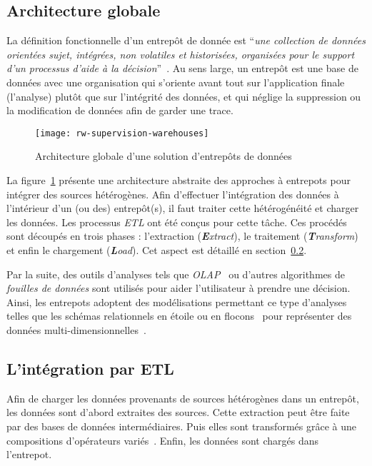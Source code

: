 \subsection{Architecture globale}
La définition fonctionnelle d'un entrepôt de donnée est \enquote{\it une collection de données orientées sujet, intégrées, non volatiles et historisées, organisées pour le support d’un processus d’aide à la décision}~\cite{Inmon:warehouse}. Au sens large, un entrepôt est une base de données avec une organisation qui s'oriente avant tout sur l'application finale (l'analyse) plutôt que sur l'intégrité des données, et qui néglige la suppression ou la modification de données afin de garder une trace.
\begin{figure}[ht]
	\centering
	\texttt{[image: rw-supervision-warehouses]}
	\caption{Architecture globale d'une solution d'entrepôts de données}\label{fig:rw:supervision:warehouses}
\end{figure}
La figure~\ref{fig:rw:supervision:warehouses} présente une architecture abstraite des approches à entrepots pour intégrer des sources hétérogènes. Afin d'effectuer l'intégration des données à l'intérieur d'un (ou des) entrepôt(s), il faut traiter cette hétérogénéité et charger les données. Les processus \textit{ETL} ont été conçus pour cette tâche. Ces procédés sont découpés en trois phases : l'extraction (\textit{\textbf{E}xtract}), le traitement (\textit{\textbf{T}ransform}) et enfin le chargement (\textit{\textbf{L}oad}). Cet aspect est détaillé en section~\ref{sec:rw:supervision:warehouse:etl}.

Par la suite, des outils d'analyses tels que \textit{OLAP}~\cite{Codd:olap} ou d'autres algorithmes de \textit{fouilles de données} sont utilisés pour aider l'utilisateur à prendre une décision. Ainsi, les entrepots adoptent des modélisations permettant ce type d'analyses telles que les schémas relationnels en étoile ou en flocons~\cite{Levene:snowflake} pour représenter des données multi-dimensionnelles~\cite{Gray:cube}.

\subsection{L'intégration par ETL}\label{sec:rw:supervision:warehouse:etl}
Afin de charger les données provenants de sources hétérogènes dans un entrepôt, les données sont d'abord extraites des sources. Cette extraction peut être faite par des bases de données intermédiaires. Puis elles sont transformés grâce à une compositions d'opérateurs variés~\cite{Vassiliadis:taxonomy}. Enfin, les données sont chargés dans l'entrepot.


